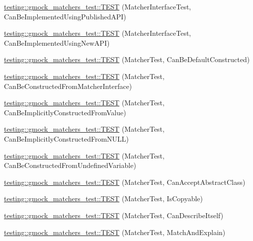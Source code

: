 \begin{DoxyCompactItemize}
\item 
\mbox{\hyperlink{namespacetesting_1_1gmock__matchers__test_a2d73acaddb6b28a827ce0e475ffc9cde}{testing\+::gmock\+\_\+matchers\+\_\+test\+::\+T\+E\+ST}} (Matcher\+Interface\+Test, Can\+Be\+Implemented\+Using\+Published\+A\+PI)
\item 
\mbox{\hyperlink{namespacetesting_1_1gmock__matchers__test_ad212c5ac3ef7a102a6b1712e40e06a1e}{testing\+::gmock\+\_\+matchers\+\_\+test\+::\+T\+E\+ST}} (Matcher\+Interface\+Test, Can\+Be\+Implemented\+Using\+New\+A\+PI)
\item 
\mbox{\hyperlink{namespacetesting_1_1gmock__matchers__test_a8843a1545b9e09d73b565cf94f2e5f8b}{testing\+::gmock\+\_\+matchers\+\_\+test\+::\+T\+E\+ST}} (Matcher\+Test, Can\+Be\+Default\+Constructed)
\item 
\mbox{\hyperlink{namespacetesting_1_1gmock__matchers__test_a3dee288df7e811f817850a5187c42669}{testing\+::gmock\+\_\+matchers\+\_\+test\+::\+T\+E\+ST}} (Matcher\+Test, Can\+Be\+Constructed\+From\+Matcher\+Interface)
\item 
\mbox{\hyperlink{namespacetesting_1_1gmock__matchers__test_a2bd9ad37a8b9f03b10a15ed322c3249c}{testing\+::gmock\+\_\+matchers\+\_\+test\+::\+T\+E\+ST}} (Matcher\+Test, Can\+Be\+Implicitly\+Constructed\+From\+Value)
\item 
\mbox{\hyperlink{namespacetesting_1_1gmock__matchers__test_a0de94b029c8a13180276e411f4d75f7f}{testing\+::gmock\+\_\+matchers\+\_\+test\+::\+T\+E\+ST}} (Matcher\+Test, Can\+Be\+Implicitly\+Constructed\+From\+N\+U\+LL)
\item 
\mbox{\hyperlink{namespacetesting_1_1gmock__matchers__test_a014dc1cd18e74ed71db5b407972e6f50}{testing\+::gmock\+\_\+matchers\+\_\+test\+::\+T\+E\+ST}} (Matcher\+Test, Can\+Be\+Constructed\+From\+Undefined\+Variable)
\item 
\mbox{\hyperlink{namespacetesting_1_1gmock__matchers__test_a3904607b2566bd4daaec8fa3f5ce1d6e}{testing\+::gmock\+\_\+matchers\+\_\+test\+::\+T\+E\+ST}} (Matcher\+Test, Can\+Accept\+Abstract\+Class)
\item 
\mbox{\hyperlink{namespacetesting_1_1gmock__matchers__test_ab37bd0e535503a8f39e34b0554b2fb28}{testing\+::gmock\+\_\+matchers\+\_\+test\+::\+T\+E\+ST}} (Matcher\+Test, Is\+Copyable)
\item 
\mbox{\hyperlink{namespacetesting_1_1gmock__matchers__test_ae85f2ec21822e884ac9ff58741d420d2}{testing\+::gmock\+\_\+matchers\+\_\+test\+::\+T\+E\+ST}} (Matcher\+Test, Can\+Describe\+Itself)
\item 
\mbox{\hyperlink{namespacetesting_1_1gmock__matchers__test_aee6cef32b22ddd6ce8b87578c3de4198}{testing\+::gmock\+\_\+matchers\+\_\+test\+::\+T\+E\+ST}} (Matcher\+Test, Match\+And\+Explain)

\end{DoxyCompactItemize}
